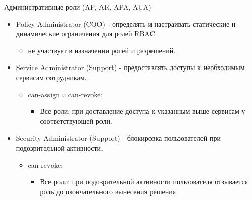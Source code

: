 \documentclass[10pt]{beamer}
\begin{document}
\begin{frame}{Административные роли (AP, AR, APA, AUA)}
    \begin{itemize}
        \item Policy Administrator (COO) - определять и настраивать статические и динамические ограничения для ролей RBAC.
            \begin{itemize}
                \item не участвует в назначении ролей и разрешений.
            \end{itemize}
        \item Service Administrator (Support) - предоставлять доступы к необходимым сервисам сотрудникам.
        \begin{itemize}
            \item can-assign и can-revoke:
            \begin{itemize}
                \item Все роли: при доставление доступа к указанным выше сервисам у соответствующей роли.
            \end{itemize}
        \end{itemize}
        \item Security Administrator (Support) - блокировка пользователей при подозрительной активности.
        \begin{itemize}
            \item can-revoke:
            \begin{itemize}
                \item Все роли: при подозрительной активности пользователя отзывается роль до окончательного вынесения решения.
            \end{itemize}
        \end{itemize}
    \end{itemize}
\end{frame}
\end{document}
